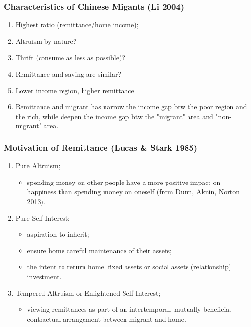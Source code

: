 \documentclass[10pt]{beamer}
\begin{document}
\begin{frame}[c]\frametitle{Characteristics of Chinese Migants (Li 2004)}
\begin{enumerate}
    \item Highest ratio (remittance/home income);
    \item Altruism by nature?
    \item Thrift (consume as less as possible)?
    \item Remittance and saving are similar?
    \item Lower income region, higher remittance
    \item Remittance and migrant has narrow the income gap btw the poor region and the rich, while deepen the income gap btw the "migrant" area and "non-migrant" area.
\end{enumerate}
\end{frame}



\begin{frame}[c]\frametitle{Motivation of Remittance (Lucas \& Stark 1985)}

\begin{enumerate}
    \item Pure Altruism;
    \begin{itemize}
        \item spending money on other people have a more positive impact on happiness than spending money on oneself (from Dunn, Aknin, Norton 2013).
    \end{itemize}
    \item Pure Self-Interest;
    \begin{itemize}
        \item aspiration to inherit;
        \item ensure home careful maintenance of their assets;
        \item the intent to return home, fixed assets or social assets (relationship) investment.
    \end{itemize}
    \item Tempered Altruism or Enlightened Self-Interest;
    \begin{itemize}
        \item viewing remittances as part of an intertemporal, mutually beneficial contractual arrangement between migrant and home.
    \end{itemize}
\end{enumerate}
\end{frame}
\end{document}
